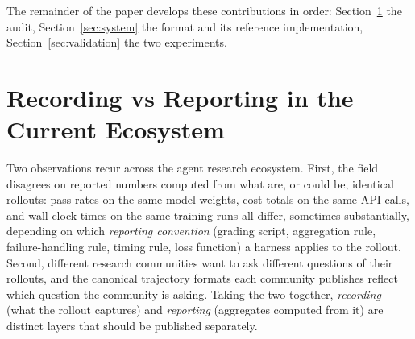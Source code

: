 \documentclass{article}
\begin{document}
The remainder of the paper develops these contributions in
order: Section~\ref{sec:problem} the audit,
Section~\ref{sec:system} the format and its reference
implementation, Section~\ref{sec:validation} the two
experiments.

\section{Recording vs Reporting in the Current Ecosystem}
\label{sec:problem}
%

Two observations recur across the agent research ecosystem.
First, the field disagrees on reported numbers computed from
what are, or could be, identical rollouts: pass rates on the
same model weights, cost totals on the same API calls, and
wall-clock times on the same training runs all differ,
sometimes substantially, depending on which \emph{reporting
convention} (grading script, aggregation rule, failure-handling
rule, timing rule, loss function) a harness applies to the
rollout. Second,
different research communities want to ask different questions
of their rollouts, and the canonical trajectory formats each
community publishes reflect which question the community is
asking. Taking the two together, \emph{recording} (what the
rollout captures) and \emph{reporting} (aggregates computed
from it) are distinct layers that should be published
separately.
\end{document}
